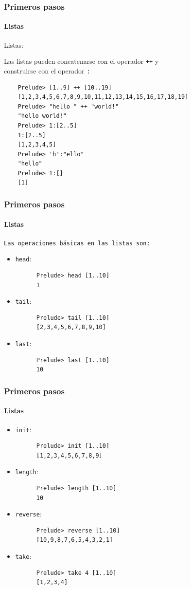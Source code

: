 \documentclass{beamer}
\begin{document}
\begin{frame}[fragile]
  \frametitle{Primeros pasos}
  \framesubtitle{Listas}
  \begin{block}{Listas:}
  \end{block}
  Las listas pueden concatenarse con el operador \verb~++~ y\\construirse con el operador \verb~:~
  \begin{verbatim}
    Prelude> [1..9] ++ [10..19]
    [1,2,3,4,5,6,7,8,9,10,11,12,13,14,15,16,17,18,19]
    Prelude> "hello " ++ "world!"
    "hello world!"
    Prelude> 1:[2..5]
    1:[2..5]
    [1,2,3,4,5]
    Prelude> 'h':"ello"
    "hello"
    Prelude> 1:[]
    [1]
  \end{verbatim}
\end{frame}

\begin{frame}[fragile]
  \frametitle{Primeros pasos}
  \framesubtitle{Listas}
  \texttt{Las operaciones básicas en las listas son:}
  \begin{itemize}
  \item \verb~head~:
    \begin{verbatim}
      Prelude> head [1..10]
      1
    \end{verbatim}
  \item \verb~tail~:
    \begin{verbatim}
      Prelude> tail [1..10]
      [2,3,4,5,6,7,8,9,10]
    \end{verbatim}
  \item \verb~last~:
    \begin{verbatim}
      Prelude> last [1..10]
      10
    \end{verbatim}

  \end{itemize}
\end{frame}

\begin{frame}[fragile]
  \frametitle{Primeros pasos}
  \framesubtitle{Listas}
  \begin{itemize}
  \item \verb~init~:
    \begin{verbatim}
      Prelude> init [1..10]
      [1,2,3,4,5,6,7,8,9]
    \end{verbatim}
  \item \verb~length~:
    \begin{verbatim}
      Prelude> length [1..10]
      10
    \end{verbatim}
  \item \verb~reverse~:
    \begin{verbatim}
      Prelude> reverse [1..10]
      [10,9,8,7,6,5,4,3,2,1]
    \end{verbatim}
  \item \verb~take~:
    \begin{verbatim}
      Prelude> take 4 [1..10]
      [1,2,3,4]
    \end{verbatim}
  \end{itemize}
\end{frame}
\end{document}
